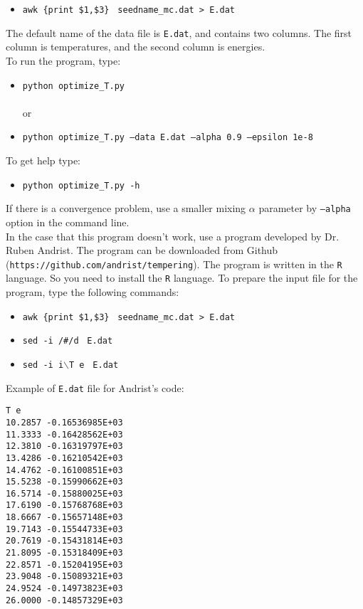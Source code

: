 \documentclass[10pt]{report}
\begin{document}
\begin{itemize}
\item {\tt awk \textquotesingle\{print \$1,\$3\}\textquotesingle $\,\,$   seedname\_mc.dat > E.dat}
\end{itemize}

The default name of the data file is {\tt E.dat}, and contains two columns. The first column is temperatures, and the second column is energies.\\

To run the program, type:
\begin{itemize}
\item  {\tt python  optimize\_T.py}  \\
\\
   or
\item  {\tt python optimize\_T.py --data E.dat --alpha 0.9 --epsilon 1e-8}
\end{itemize}

To get help type:
\begin{itemize}
\item {\tt python optimize\_T.py -h}
\end{itemize}
If there is a convergence problem, use a smaller mixing $\alpha$ parameter by {\tt --alpha} option in the command line.\\

In the case that this program doesn't work, use a program developed by Dr. Ruben Andrist.
The program can be downloaded from Github ({\tt https://github.com/andrist/tempering}).
The program is written in the {\tt R} language. So you need to install the {\tt R} language.
To prepare the input file for the program, type the following commands:

\begin{itemize}
\item  {\tt awk \textquotesingle\{print \$1,\$3\}\textquotesingle $\,\,$   seedname\_mc.dat  > E.dat}
\item  {\tt sed -i \textquotesingle/\#/d\textquotesingle $\,\,$  E.dat }
\item  {\tt sed -i  i$\backslash$T e\textquotesingle  $\,\,$ E.dat}
\end{itemize}

Example of {\tt E.dat}  file for Andrist's code:
{\scriptsize    
\begin{verbatim}
T e
10.2857 -0.16536985E+03
11.3333 -0.16428562E+03
12.3810 -0.16319797E+03
13.4286 -0.16210542E+03
14.4762 -0.16100851E+03
15.5238 -0.15990662E+03
16.5714 -0.15880025E+03
17.6190 -0.15768768E+03
18.6667 -0.15657148E+03
19.7143 -0.15544733E+03
20.7619 -0.15431814E+03
21.8095 -0.15318409E+03
22.8571 -0.15204195E+03
23.9048 -0.15089321E+03
24.9524 -0.14973823E+03
26.0000 -0.14857329E+03
\end{verbatim}
}
\end{document}
